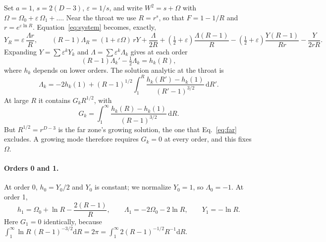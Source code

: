 \documentclass[11pt]{article}
\theoremstyle{remark}
\newcommand{\dd}{\mathrm{d}}
\newcommand{\eps}{\varepsilon}
\begin{document}
Set $a=1$, $s=2(D-3)$, $\eps=1/s$, and write $W^2=s+\Omega$ with $\Omega=\Omega_0+\eps\,\Omega_1+\dots$. Near the throat
we use $R=r^s$, so that $F=1-1/R$ and $r=e^{\eps\ln R}$. Equation~\eqref{eq:system} becomes, exactly,
\begin{equation}
Y_R=\eps\,\frac{\Lambda r}{R},\qquad
(R-1)\Lambda_R=(1+\eps\Omega)\,rY+\frac{\Lambda}{2R}+\left(\tfrac12+\eps\right)\frac{\Lambda(R-1)}{R}
-\left(\tfrac12+\eps\right)\frac{Y(R-1)}{Rr}-\frac{Y}{2rR}.\label{eq:near}
\end{equation}
Expanding $Y=\sum\eps^kY_k$ and $\Lambda=\sum\eps^k\Lambda_k$ gives at each order
\begin{equation}
(R-1)\Lambda_k'-\tfrac12\Lambda_k=h_k(R),\label{eq:order}
\end{equation}
where $h_k$ depends on lower orders. The solution analytic at the throat is
\begin{equation}
\Lambda_k=-2h_k(1)+(R-1)^{1/2}\int_1^R\frac{h_k(R')-h_k(1)}{(R'-1)^{3/2}}\,\dd R'.\label{eq:sol}
\end{equation}
At large $R$ it contains $G_kR^{1/2}$, with
\begin{equation}
G_k=\int_1^\infty\frac{h_k(R)-h_k(1)}{(R-1)^{3/2}}\,\dd R.
\end{equation}
But $R^{1/2}=r^{D-3}$ is the far zone's growing solution, the one that Eq.~\eqref{eq:far} excludes. A growing mode
therefore requires $G_k=0$ at every order, and this fixes $\Omega$.

\paragraph{Orders 0 and 1.} At order 0, $h_0=Y_0/2$ and $Y_0$ is constant; we normalize $Y_0=1$, so $\Lambda_0=-1$. At
order 1,
\begin{equation}
h_1=\Omega_0+\ln R-\frac{2(R-1)}{R},\qquad \Lambda_1=-2\Omega_0-2\ln R,\qquad Y_1=-\ln R.
\end{equation}
Here $G_1=0$ identically, because $\int_1^\infty\ln R\,(R-1)^{-3/2}\dd R=2\pi=\int_1^\infty2(R-1)^{-1/2}R^{-1}\dd R$.
\end{document}
